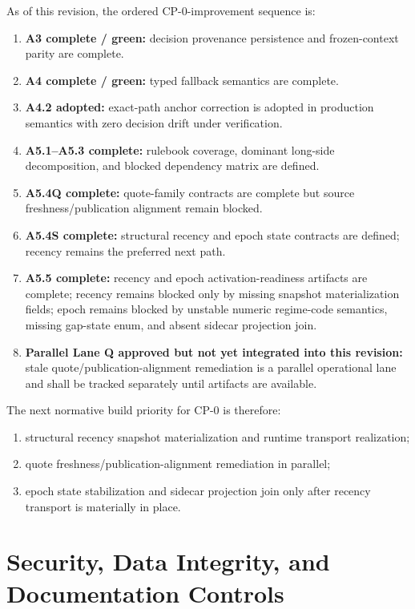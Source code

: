 \documentclass[11pt]{report}
\begin{document}
As of this revision, the ordered CP-0-improvement sequence is:
\begin{enumerate}[leftmargin=1.2cm]
    \item \textbf{A3 complete / green:} decision provenance persistence and frozen-context parity are complete.
    \item \textbf{A4 complete / green:} typed fallback semantics are complete.
    \item \textbf{A4.2 adopted:} exact-path anchor correction is adopted in production semantics with zero decision drift under verification.
    \item \textbf{A5.1--A5.3 complete:} rulebook coverage, dominant long-side decomposition, and blocked dependency matrix are defined.
    \item \textbf{A5.4Q complete:} quote-family contracts are complete but source freshness/publication alignment remain blocked.
    \item \textbf{A5.4S complete:} structural recency and epoch state contracts are defined; recency remains the preferred next path.
    \item \textbf{A5.5 complete:} recency and epoch activation-readiness artifacts are complete; recency remains blocked only by missing snapshot materialization fields; epoch remains blocked by unstable numeric regime-code semantics, missing gap-state enum, and absent sidecar projection join.
    \item \textbf{Parallel Lane Q approved but not yet integrated into this revision:} stale quote/publication-alignment remediation is a parallel operational lane and shall be tracked separately until artifacts are available.
\end{enumerate}

The next normative build priority for CP-0 is therefore:
\begin{enumerate}[leftmargin=1.2cm]
    \item structural recency snapshot materialization and runtime transport realization;
    \item quote freshness/publication-alignment remediation in parallel;
    \item epoch state stabilization and sidecar projection join only after recency transport is materially in place.
\end{enumerate}
\chapter{Security, Data Integrity, and Documentation Controls}
\end{document}
